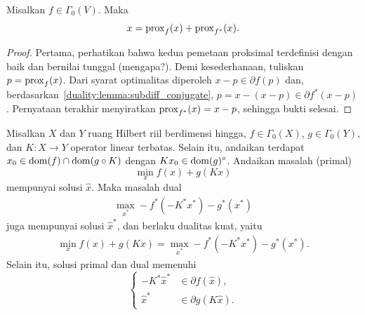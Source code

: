 \begin{theorem}\label{duality:thm:Moreau:id}
    Misalkan $f\in\Gamma_0(V)$. Maka
    \begin{equation}
        x = \mathrm{prox}_f(x) + \mathrm{prox}_{f^*}(x).
    \end{equation}
\end{theorem}
\begin{proof}
    Pertama, perhatikan bahwa kedua pemetaan proksimal terdefinisi dengan baik dan bernilai tunggal (mengapa?). Demi kesederhanaan, tuliskan $p = \mathrm{prox}_f(x)$. Dari syarat optimalitas diperoleh $x-p\in\partial f(p)$ dan, berdasarkan~\cref{duality:lemma:subdiff_conjugate}, $p = x - (x-p)\in \partial f^*(x-p)$. Pernyataan terakhir menyiratkan $\mathrm{prox}_{f^*}(x) = x-p$, sehingga bukti selesai.
\end{proof}
\begin{theorem}\label{duality:eq:fenchel_duality}
    Misalkan $X$ dan $Y$ ruang Hilbert riil berdimensi hingga, $f\in\Gamma_0(X)$, $g\in\Gamma_0(Y)$, dan $K:X\rightarrow Y$ operator linear terbatas. Selain itu, andaikan terdapat $x_0 \in \operatorname{\mathrm{dom}}(f) \cap \operatorname{\mathrm{dom}}(g\circ K)$ dengan $K x_0 \in \operatorname{\mathrm{dom}}(g)^\circ$. Andaikan masalah (primal)
    \begin{equation}
        \min_{x} f(x) + g(Kx)
    \end{equation}
    mempunyai solusi $\hat x$. Maka masalah dual
    \begin{equation}
        \begin{aligned}
            \max_{x^*} -f^*(-K^*x^*) - g^*(x^*)
        \end{aligned}
    \end{equation}
    juga mempunyai solusi $\hat x^*$, dan berlaku dualitas kuat, yaitu
    \begin{equation}
        \begin{aligned}
            \min_{x} f(x) + g(Kx)
            = \max_{x^*} -f^*(-K^*x^*) - g^*(x^*).
        \end{aligned}
    \end{equation}
    Selain itu, solusi primal dan dual memenuhi
    \begin{equation}
        \begin{cases}
            -K^*\hat x^*&\in \partial f(\hat x),\\
            \hat x^* &\in \partial g(K\hat x).
        \end{cases}
    \end{equation}
\end{theorem}
